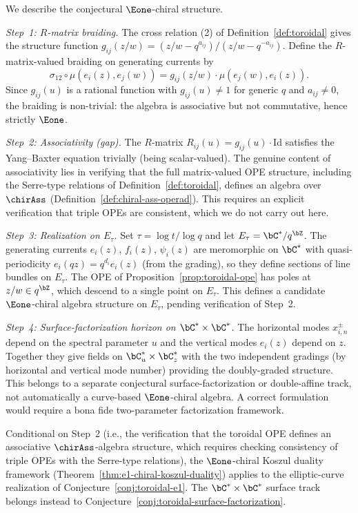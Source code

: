 \begin{remark}
We describe the conjectural $\Eone$-chiral structure.

\emph{Step~1: $R$-matrix braiding.}
The cross relation (2) of Definition~\ref{def:toroidal} gives the
structure function $g_{ij}(z/w) = (z/w - q^{a_{ij}})/(z/w - q^{-a_{ij}})$.
Define the $R$-matrix-valued braiding on generating currents by
\[
\sigma_{12} \circ \mu(e_i(z), e_j(w))
= g_{ij}(z/w) \cdot \mu(e_j(w), e_i(z)).
\]
Since $g_{ij}(u)$ is a rational function with $g_{ij}(u) \neq 1$
for generic $q$ and $a_{ij} \neq 0$, the braiding is non-trivial:
the algebra is associative but not commutative, hence strictly $\Eone$.

\emph{Step~2: Associativity (gap).}
The $R$-matrix $R_{ij}(u) = g_{ij}(u) \cdot \mathrm{Id}$ satisfies
the Yang--Baxter equation trivially (being scalar-valued).
The genuine content of associativity lies in verifying that the
full matrix-valued OPE structure, including the Serre-type relations
of Definition~\ref{def:toroidal}, defines an algebra over $\chirAss$
(Definition~\ref{def:chiral-ass-operad}). This requires an explicit
verification that triple OPEs are consistent, which we do not
carry out here.

\emph{Step~3: Realization on $E_\tau$.}
Set $\tau = \log t / \log q$ and let $E_\tau = \bC^*/q^{\bZ}$.
The generating currents $e_i(z)$, $f_i(z)$, $\psi_i(z)$ are meromorphic
on $\bC^*$ with quasi-periodicity $e_i(qz) = q^{d_i} e_i(z)$
(from the grading), so they define sections of line bundles on $E_\tau$.
The OPE of Proposition~\ref{prop:toroidal-ope} has poles at
$z/w \in q^{\bZ}$, which descend to a single point on $E_\tau$.
This defines a candidate $\Eone$-chiral algebra structure on $E_\tau$,
pending verification of Step~2.

\emph{Step~4: Surface-factorization horizon on $\bC^* \times \bC^*$.}
The horizontal modes $x^\pm_{i,n}$ depend on the spectral
parameter $u$ and the vertical modes $e_i(z)$ depend on $z$.
Together they give fields on $\bC^*_u \times \bC^*_z$ with the
two independent gradings (by horizontal and vertical mode number)
providing the doubly-graded structure. This belongs to a separate
conjectural surface-factorization or double-affine track, not
automatically a
curve-based $\Eone$-chiral algebra. A correct formulation would
require a bona fide two-parameter factorization framework.

Conditional on Step~2 (i.e., the verification that the toroidal OPE
defines an associative $\chirAss$-algebra structure, which requires
checking consistency of triple OPEs with the Serre-type relations), the
$\Eone$-chiral Koszul duality framework
(Theorem~\ref{thm:e1-chiral-koszul-duality}) applies to the
elliptic-curve realization of Conjecture~\ref{conj:toroidal-e1}. The
$\bC^* \times \bC^*$ surface track belongs instead to
Conjecture~\ref{conj:toroidal-surface-factorization}.
\end{remark}


